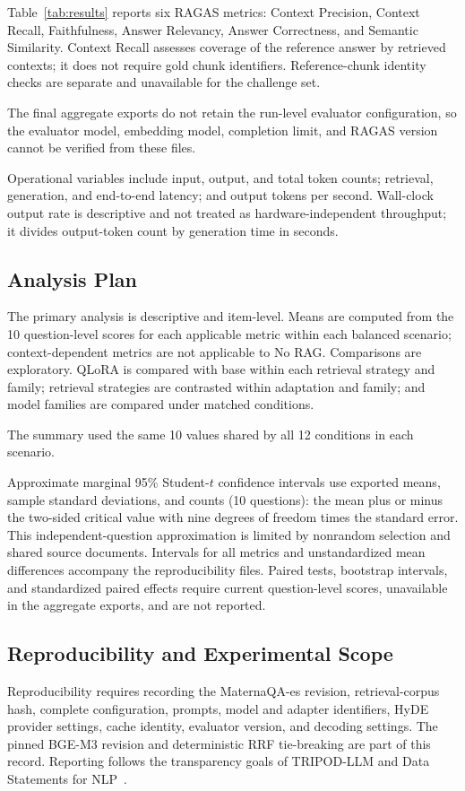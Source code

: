 Table~\ref{tab:results} reports six RAGAS metrics: Context Precision,
Context Recall, Faithfulness, Answer Relevancy, Answer Correctness, and
Semantic Similarity. Context Recall assesses coverage of the reference
answer by retrieved contexts; it does not require gold chunk identifiers.
Reference-chunk identity checks are separate and unavailable for the
challenge set.

The final aggregate exports do not retain the run-level evaluator
configuration, so the evaluator model, embedding model, completion limit,
and RAGAS version cannot be verified from these files.

Operational variables include input, output, and total token counts;
retrieval, generation, and end-to-end latency; and output tokens per
second. Wall-clock output rate is descriptive and not treated as
hardware-independent throughput; it divides output-token count by
generation time in seconds.

\subsection{Analysis Plan}
The primary analysis is descriptive and item-level. Means are computed from
the 10 question-level scores for each applicable metric within each balanced
scenario; context-dependent metrics are not applicable to No RAG.
Comparisons are exploratory. QLoRA is compared with
base within each retrieval strategy and family; retrieval strategies are
contrasted within adaptation and family; and model families are compared
under matched conditions.

The summary used the same 10  values shared by all 12
conditions in each scenario.

Approximate marginal 95\% Student-$t$ confidence intervals use exported
means, sample standard deviations, and counts (10 questions): the mean plus
or minus the two-sided critical value with nine degrees of freedom times
the standard error. This independent-question approximation is limited by
nonrandom selection and shared source documents.
Intervals for all metrics and unstandardized mean differences accompany the
reproducibility files. Paired tests, bootstrap intervals, and standardized
paired effects require current question-level scores, unavailable in the
aggregate exports, and are not reported.

\subsection{Reproducibility and Experimental Scope}
Reproducibility requires recording the MaternaQA-es revision,
retrieval-corpus hash, complete configuration, prompts, model and adapter
identifiers, HyDE provider settings, cache identity, evaluator version, and
decoding settings. The pinned BGE-M3 revision and deterministic RRF
tie-breaking are part of this record. Reporting follows the transparency
goals of TRIPOD-LLM and Data Statements for
NLP~\cite{gallifant2025tripod,bender2018data}.

